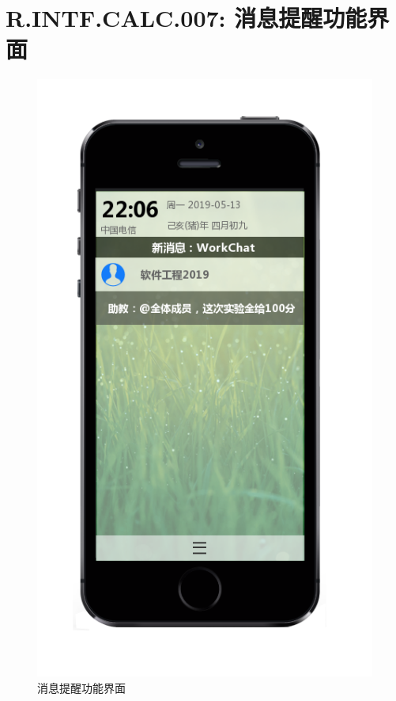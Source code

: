     \section{R.INTF.CALC.007: 消息提醒功能界面}
    \begin{figure}[h]
        \centering
        \includegraphics[scale=0.6]{OutlineDesign/figures/消息提醒功能界面.png}
        \caption{消息提醒功能界面}
        \label{fig:server_flow}
    \end{figure}
    \newpage

